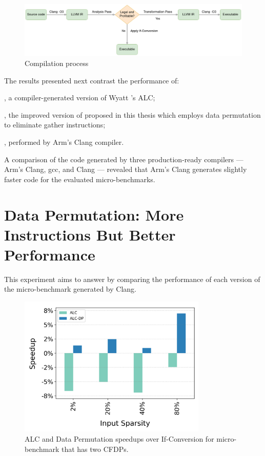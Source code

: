 \begin{figure}[t]
  \includegraphics[width=1.05\textwidth, height=.21\textheight]{Figures/Evaluations/Compilation Process.png}
  \caption{Compilation process}
  \label{fig:compile-process}
\end{figure}



The results presented next contrast the performance of:
\begin{inparaenum}[(i)]
  \item \textbf{\ALC}, a compiler-generated version of Wyatt \etal's ALC;
  \item \textbf{\ALCdp}, the improved version of \ALC proposed in this thesis which employs data permutation to eliminate gather instructions;
  \item \textbf{\ifconv}, \ifconversion performed by Arm's Clang compiler.
\end{inparaenum}
A comparison of the \ifconversion code generated by three production-ready compilers --- Arm's Clang, \acrshort{gcc}, and Clang --- revealed that Arm's Clang generates slightly faster code for the evaluated micro-benchmarks.


\section{Data Permutation: More Instructions But Better Performance}
\label{sec:data-permutation-evaluation}



This experiment aims to answer  by comparing the performance of each version of the \ifElseBench micro-benchmark generated by Clang.

\begin{figure}[t]
  \includegraphics[width=0.8\textwidth]{Figures/Evaluations/if_then_else_many_scatter_speedup.png}
  \caption{ALC and Data Permutation speedups over If-Conversion for \ifElseBench micro-benchmark that has two CFDPs.}
  \label{fig:if-then-else-many-scatter-speedup}
\end{figure}

